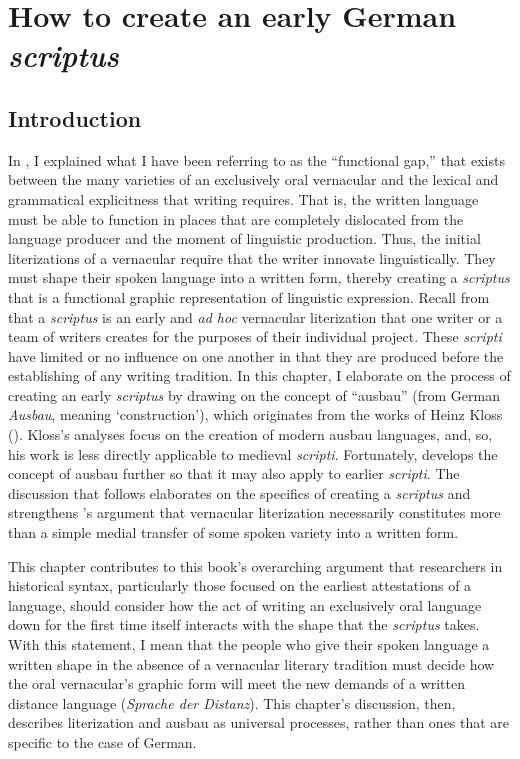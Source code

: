 \chapter{How to create an early German \textit{scriptus}}\label{sec:chap:4}

\section{Introduction}
In , I explained what I have been referring to as the “functional gap,” that exists between the many varieties of an exclusively oral vernacular and the lexical and grammatical explicitness that writing requires. That is, the written language must be able to function in places that are completely dislocated from the language producer and the moment of linguistic production. Thus, the initial literizations of a vernacular require that the writer innovate linguistically. They must shape their spoken language into a written form, thereby creating a \textit{scriptus} that is a functional graphic representation of linguistic expression. Recall from  that a \textit{scriptus} is an early and \textit{ad hoc} vernacular literization that one writer or a team of writers creates for the purposes of their individual project. These \textit{scripti} have limited or no influence on one another in that they are produced before the establishing of any writing tradition. In this chapter, I elaborate on the process of creating an early \textit{scriptus} by drawing on the concept of “ausbau” (from German \textit{Ausbau}, meaning ‘construction’), which originates from the works of Heinz Kloss (\citealt{Kloss1967,Kloss1978}). Kloss’s analyses focus on the creation of modern ausbau languages, and, so, his work is less directly applicable to medieval \textit{scripti}. Fortunately, \citet{KochOesterreicher1994} develops the concept of ausbau further so that it may also apply to earlier \textit{scripti}. The discussion that follows elaborates on the specifics of creating a \textit{scriptus} and strengthens ’s argument that vernacular literization necessarily constitutes more than a simple medial transfer of some spoken variety into a written form.

This chapter contributes to this book’s overarching argument that researchers in historical syntax, particularly those focused on the earliest attestations of a language, should consider how the act of writing an exclusively oral language down for the first time itself interacts with the shape that the \textit{scriptus} takes. With this statement, I mean that the people who give their spoken language a written shape in the absence of a vernacular literary tradition must decide how the oral vernacular’s graphic form will meet the new demands of a written distance language (\textit{Sprache der Distanz}). This chapter’s discussion, then, describes literization and ausbau as universal processes, rather than ones that are specific to the case of German.

